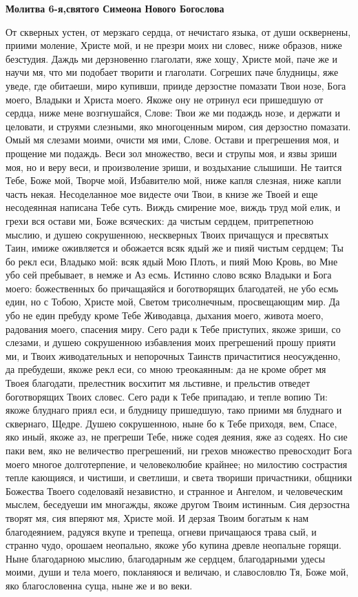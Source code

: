 \bfseries Молитва 6-я,святого Симеона Нового Богослова\normalfont{}


От скверных устен, от мерзкаго сердца, от нечистаго языка, от души осквернены, приими моление, Христе мой, и не презри моих ни словес, ниже образов, ниже безстудия. Даждь ми дерзновенно глаголати, яже хощу, Христе мой, паче же и научи мя, что ми подобает творити и глаголати. Согреших паче блудницы, яже уведе, где обитаеши, миро купивши, прииде дерзостне помазати Твои нозе, Бога моего, Владыки и Христа моего. Якоже ону не отринул еси пришедшую от сердца, ниже мене возгнушайся, Слове: Твои же ми подаждь нозе, и держати и целовати, и струями слезными, яко многоценным миром, сия дерзостно помазати. Омый мя слезами моими, очисти мя ими, Слове. Остави и прегрешения моя, и прощение ми подаждь. Веси зол множество, веси и струпы моя, и язвы зриши моя, но и веру веси, и произволение зриши, и воздыхание слышиши. Не таится Тебе, Боже мой, Творче мой, Избавителю мой, ниже капля слезная, ниже капли часть некая. Несоделанное мое видесте очи Твои, в книзе же Твоей и еще несодеянная написана Тебе суть. Виждь смирение мое, виждь труд мой елик, и грехи вся остави ми, Боже всяческих: да чистым сердцем, притрепетною мыслию, и душею сокрушенною, нескверных Твоих причащуся и пресвятых Таин, имиже оживляется и обожается всяк ядый же и пияй чистым сердцем; Ты бо рекл еси, Владыко мой: всяк ядый Мою Плоть, и пияй Мою Кровь, во Мне убо сей пребывает, в немже и Аз есмь. Истинно слово всяко Владыки и Бога моего: божественных бо причащаяйся и боготворящих благодатей, не убо есмь един, но с Тобою, Христе мой, Светом трисолнечным, просвещающим мир. Да убо не един пребуду кроме Тебе Живодавца, дыхания моего, живота моего, радования моего, спасения миру. Сего ради к Тебе приступих, якоже зриши, со слезами, и душею сокрушенною избавления моих прегрешений прошу прияти ми, и Твоих живодательных и непорочных Таинств причаститися неосужденно, да пребудеши, якоже рекл еси, со мною треокаянным: да не кроме обрет мя Твоея благодати, прелестник восхитит мя льстивне, и прельстив отведет боготворящих Твоих словес. Сего ради к Тебе припадаю, и тепле вопию Ти: якоже блуднаго приял еси, и блудницу пришедшую, тако приими мя блуднаго и сквернаго, Щедре. Душею сокрушенною, ныне бо к Тебе приходя, вем, Спасе, яко иный, якоже аз, не прегреши Тебе, ниже содея деяния, яже аз содеях. Но сие паки вем, яко не величество прегрешений, ни грехов множество превосходит Бога моего многое долготерпение, и человеколюбие крайнее; но милостию сострастия тепле кающияся, и чистиши, и светлиши, и света твориши причастники, общники Божества Твоего соделоваяй независтно, и странное и Ангелом, и человеческим мыслем, беседуеши им многажды, якоже другом Твоим истинным. Сия дерзостна творят мя, сия вперяют мя, Христе мой. И дерзая Твоим богатым к нам благодеянием, радуяся вкупе и трепеща, огневи причащаюся трава сый, и странно чудо, орошаем неопально, якоже убо купина древле неопальне горящи. Ныне благодарною мыслию, благодарным же сердцем, благодарными удесы моими, души и тела моего, покланяюся и величаю, и славословлю Тя, Боже мой, яко благословенна суща, ныне же и во веки.




